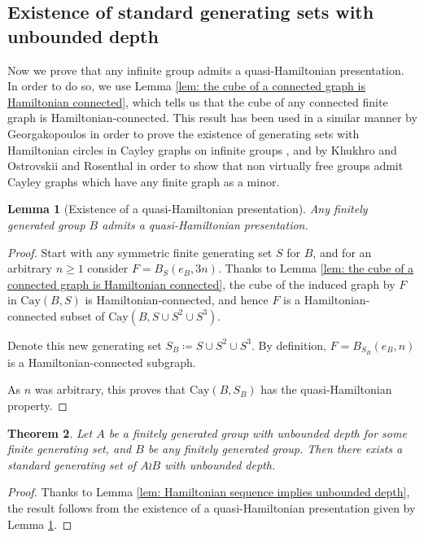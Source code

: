 \documentclass[reqno,oneside]{amsart}
\newcommand{\cay}[2]{\mathrm{Cay}(#1,#2)}
\theoremstyle{plain}
\newtheorem{thm}{Theorem}[section] %
\newtheorem{lem}[thm]{Lemma}
\theoremstyle{definition}
\begin{document}
\subsection{Existence of standard generating sets with unbounded depth}
Now we prove that any infinite group admits a quasi-Hamiltonian presentation. In order to do so, we use Lemma \ref{lem: the cube of a connected graph is Hamiltonian connected}, which tells us that the cube of any connected finite graph is Hamiltonian-connected. This result has been used in a similar manner by Georgakopoulos in order to prove the existence of generating sets with Hamiltonian circles in Cayley graphs on infinite groups \cite{GeorgakopoulosHamiltonian2009}, and by Khukhro \cite{Khukhro2020} and Ostrovskii and Rosenthal \cite{OstrovskiiRosenthal2015} in order to show that non virtually free groups admit Cayley graphs which have any finite graph as a minor.

\begin{lem}[Existence of a quasi-Hamiltonian presentation]\label{lem: existence of genset with quasiHamiltonian sequence} Any finitely generated group $B$ admits a quasi-Hamiltonian presentation.
\end{lem}
\begin{proof}
	Start with any symmetric finite generating set $S$ for $B$, and for an arbitrary $n\ge 1$ consider $F=B_S(e_B,3n)$. Thanks to Lemma \ref{lem: the cube of a connected graph is Hamiltonian connected}, the cube of the induced graph by $F$ in $\cay{B}{S}$ is Hamiltonian-connected, and hence $F$ is a Hamiltonian-connected subset of $\cay{B}{S\cup S^2 \cup S^3}$.
	
	Denote this new generating set $S_B\coloneqq S\cup S^2 \cup S^3$. By definition, $F=B_{S_B}(e_B,n)$ is a Hamiltonian-connected subgraph. 
	
	As $n$ was arbitrary, this proves that $\cay{B}{S_B}$ has the quasi-Hamiltonian property.
\end{proof}


\begin{thm}\label{thm: existence of genset with deep dead ends in any lamplighter} Let $A$ be a finitely generated group with unbounded depth for some finite generating set, and $B$ be any finitely generated group. Then there exists a standard generating set of $A\wr B$ with unbounded depth.
\end{thm}
\begin{proof}
	Thanks to Lemma \ref{lem: Hamiltonian sequence implies unbounded depth}, the result follows from the existence of a quasi-Hamiltonian presentation given by Lemma \ref{lem: existence of genset with quasiHamiltonian sequence}.
\end{proof}
\end{document}
